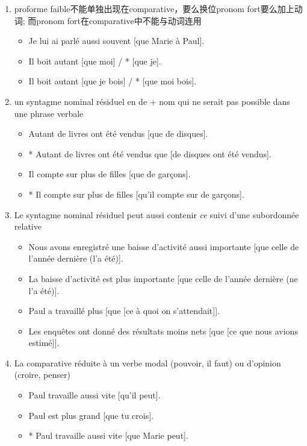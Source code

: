 \documentclass[UTF8]{report}
\begin{document}
\begin{enumerate}
\begin{itemize}
    \end{itemize}
    \item proforme faible不能单独出现在comparative，要么换位pronom fort要么加上动词; 而pronom fort在comparative中不能与动词连用
    \begin{itemize}
        \item Je lui ai parlé aussi souvent [que Marie à Paul].
        \item Il boit autant [que moi] / * [que je].
        \item Il boit autant [que je bois] / * [que moi bois].
    \end{itemize}
    \item un syntagme nominal résiduel en de + nom qui ne serait pas possible dans une phrase verbale
    \begin{itemize}
        \item Autant de livres ont été vendus [que de disques].
        \item * Autant de livres ont été vendus que [de disques ont été vendus].
        \item Il compte sur plus de filles [que de garçons].
        \item * Il compte sur plus de filles [qu’il compte sur de garçons].
    \end{itemize}
    \item Le syntagme nominal résiduel peut aussi contenir \textit{ce} suivi d’une subordonnée relative 
    \begin{itemize}
        \item Nous avons enregistré une baisse d’activité aussi importante [que celle de l’année dernière (l’a été)].
        \item La baisse d’activité est plus importante [que celle de l’année dernière (ne l’a été)].
        \item Paul a travaillé plus [que [ce à quoi on s’attendait]].
        \item Les enquêtes ont donné des résultats moins nets [que [ce que nous avions estimé]].
    \end{itemize}
    \item La comparative réduite à un verbe modal (pouvoir, il faut) ou d’opinion (croire, penser)
    \begin{itemize}
        \item Paul travaille aussi vite [qu’il peut].
        \item Paul est plus grand [que tu crois].
        \item * Paul travaille aussi vite [que Marie peut].
    \end{itemize}
\end{enumerate}
\end{document}
